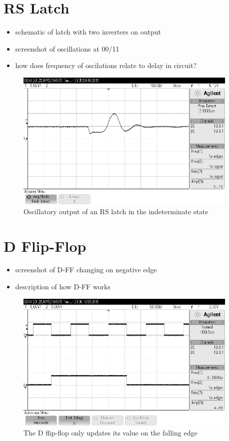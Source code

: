 \documentclass[11pt]{article}
\begin{document}
\section{RS Latch}
\begin{itemize}
	\item schematic of latch with two inverters on output
	\item screenshot of oscillations at 00/11
	\item how does frequency of oscilations relate to delay in circuit?
\end{itemize}

\begin{figure}[htpb]
	\centering
	\includegraphics[width=0.95\textwidth]{rs_latch}
	\caption{Oscillatory output of an RS latch in the indeterminate state}
	\label{fig:rs_latch}
\end{figure}

\section{D Flip-Flop}
\begin{itemize}
	\item screenshot of D-FF changing on negative edge
	\item description of how D-FF works
\end{itemize}

\begin{figure}[htpb]
	\centering
	\includegraphics[width=0.95\textwidth]{d-ff}
	\caption{The D flip-flop only updates its value on the falling edge}
	\label{fig:d-ff}
\end{figure}
\end{document}
